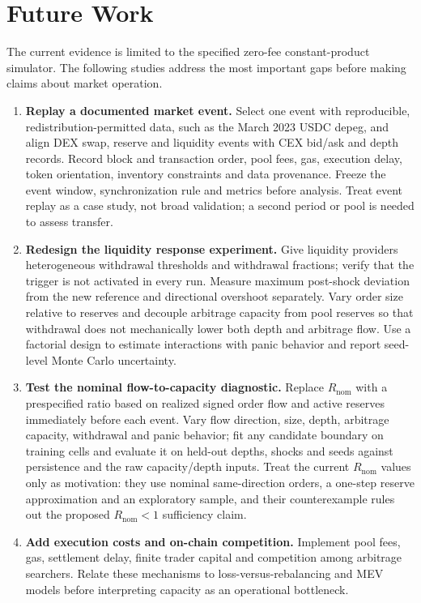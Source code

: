 \chapter{Future Work}
\label{cap:futuro}

The current evidence is limited to the specified zero-fee constant-product simulator. The following studies address the most important gaps before making claims about market operation.

\begin{enumerate}
  \item \textbf{Replay a documented market event.} Select one event with reproducible, redistribution-permitted data, such as the March 2023 USDC depeg, and align DEX swap, reserve and liquidity events with CEX bid/ask and depth records. Record block and transaction order, pool fees, gas, execution delay, token orientation, inventory constraints and data provenance. Freeze the event window, synchronization rule and metrics before analysis. Treat event replay as a case study, not broad validation; a second period or pool is needed to assess transfer.
  \item \textbf{Redesign the liquidity response experiment.} Give liquidity providers heterogeneous withdrawal thresholds and withdrawal fractions; verify that the trigger is not activated in every run. Measure maximum post-shock deviation from the new reference and directional overshoot separately. Vary order size relative to reserves and decouple arbitrage capacity from pool reserves so that withdrawal does not mechanically lower both depth and arbitrage flow. Use a factorial design to estimate interactions with panic behavior and report seed-level Monte Carlo uncertainty.
  \item \textbf{Test the nominal flow-to-capacity diagnostic.} Replace $R_{\mathrm{nom}}$ with a prespecified ratio based on realized signed order flow and active reserves immediately before each event. Vary flow direction, size, depth, arbitrage capacity, withdrawal and panic behavior; fit any candidate boundary on training cells and evaluate it on held-out depths, shocks and seeds against persistence and the raw capacity/depth inputs. Treat the current $R_{\mathrm{nom}}$ values only as motivation: they use nominal same-direction orders, a one-step reserve approximation and an exploratory sample, and their counterexample rules out the proposed $R_{\mathrm{nom}}<1$ sufficiency claim.
  \item \textbf{Add execution costs and on-chain competition.} Implement pool fees, gas, settlement delay, finite trader capital and competition among arbitrage searchers. Relate these mechanisms to loss-versus-rebalancing and MEV models before interpreting capacity as an operational bottleneck.

\end{enumerate}

